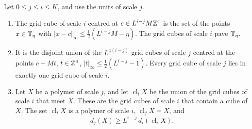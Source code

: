 \begin{lemma}\label{lem:grid-nesting}
Let $0\le j\le i\le K$, and use the units of scale $j$.
\begin{enumerate}[label=(\alph*)]
\item The grid cube of scale $i$ centred at $c\in L^{i-j}M\mathbb Z^4$ is the set of the points $x\in\mathbb T_\eta$ with $|x-c|_\infty\le\frac12(L^{i-j}M-\eta)$. The grid cubes of scale $i$ pave $\mathbb T_\eta$.
\item It is the disjoint union of the $L^{4(i-j)}$ grid cubes of scale $j$ centred at the points $c+Mt$, $t\in\mathbb Z^4$, $|t|_\infty\le\frac12(L^{i-j}-1)$. Every grid cube of scale $j$ lies in exactly one grid cube of scale $i$.
\item Let $X$ be a polymer of scale $j$, and let $\operatorname{cl}_iX$ be the union of the grid cubes of scale $i$ that meet $X$. These are the grid cubes of scale $i$ that contain a cube of $X$. The set $\operatorname{cl}_iX$ is a polymer of scale $i$, $\operatorname{cl}_jX=X$, and
\[
d_j(X)\ge L^{i-j}\,d_i(\operatorname{cl}_iX).
\]
\end{enumerate}
\end{lemma}

